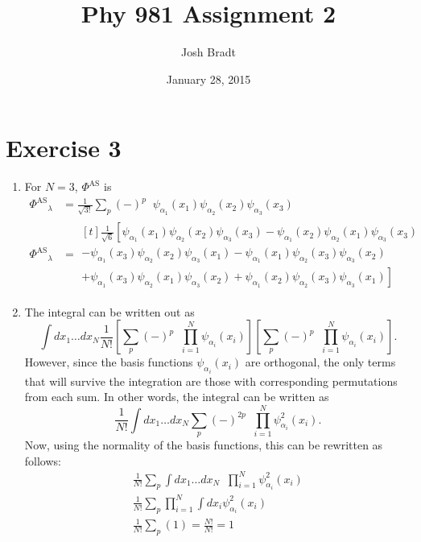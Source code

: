 \documentclass{article}
\title{Phy 981 Assignment 2}
\author{Josh Bradt}
\date{January 28, 2015}
\DeclareMathOperator{\perm}{\mathit{\hat{P}}}
\newcommand{\phias}[0]{\ensuremath{\Phi^\text{AS}}}
\newcommand{\psisub}[2]{\ensuremath{\psi_{#1}\!\left(#2\right)}}
\begin{document}
\maketitle

\section*{Exercise 3}

	\begin{enumerate}
		\item For $N=3$, $\phias$ is
		\begin{align*}
			\phias_\lambda &= \frac{1}{\sqrt{3!}} \sum_p (-)^p \perm \psisub{\alpha_1}{x_1} \psisub{\alpha_2}{x_2} \psisub{\alpha_3}{x_3} \\
			\phias_\lambda &= \begin{multlined}[t]
				\frac{1}{\sqrt{6}} \left[ 
				\psisub{\alpha_1}{x_1} \psisub{\alpha_2}{x_2} \psisub{\alpha_3}{x_3}
				- \psisub{\alpha_1}{x_2} \psisub{\alpha_2}{x_1} \psisub{\alpha_3}{x_3} \right.\\
				- \psisub{\alpha_1}{x_3} \psisub{\alpha_2}{x_2} \psisub{\alpha_3}{x_1}
				- \psisub{\alpha_1}{x_1} \psisub{\alpha_2}{x_3} \psisub{\alpha_3}{x_2} \\
				\left. + \psisub{\alpha_1}{x_3} \psisub{\alpha_2}{x_1} \psisub{\alpha_3}{x_2}
				+ \psisub{\alpha_1}{x_2} \psisub{\alpha_2}{x_3} \psisub{\alpha_3}{x_1}
				\right]
				\end{multlined}
		\end{align*}

		\item The integral can be written out as
		\begin{equation*}
			\int dx_1 \dots dx_N \frac{1}{N!} \left[ \sum_p (-)^p \perm \prod_{i=1}^{N} \psisub{\alpha_i}{x_i} \right] \left[ \sum_{p} (-)^{p} \perm \prod_{i=1}^{N} \psisub{\alpha_i}{x_i} \right].
		\end{equation*}
		However, since the basis functions $\psisub{\alpha_i}{x_i}$ are orthogonal, the only terms that will survive the integration are those with corresponding permutations from each sum. In other words, the integral can be written as
		\begin{equation*}
			\frac{1}{N!} \int dx_1 \dots dx_N \sum_p (-)^{2p} \perm \prod_{i=1}^{N} \psi_{\alpha_i}^2 (x_i).
		\end{equation*}
		Now, using the normality of the basis functions, this can be rewritten as follows:
		\begin{gather*}
			\frac{1}{N!} \sum_p \int dx_1 \dots dx_N \perm \prod_{i=1}^{N} \psi_{\alpha_i}^2 (x_i) \\
			\frac{1}{N!} \sum_p \prod_{i=1}^{N} \int dx_i \psi_{\alpha_i}^2 (x_i) \\
			\frac{1}{N!} \sum_p (1) = \frac{N!}{N!} = 1
		\end{gather*}
	\end{enumerate}
\end{document}
